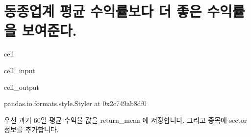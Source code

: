 \documentclass[letterpaper,10pt,english]{jupyterBook}
\begin{document}
\section{동종업계 평균 수익률보다 더 좋은 수익률을 보여준다.}
\label{\detokenize{chapter5/5.1.6_Hypothesis_6:id1}}\label{\detokenize{chapter5/5.1.6_Hypothesis_6::doc}}
\begin{sphinxuseclass}{cell}\begin{sphinxVerbatimInput}

\begin{sphinxuseclass}{cell_input}
\begin{sphinxVerbatim}[commandchars=\\\{\}]
  
\end{sphinxVerbatim}

\end{sphinxuseclass}\end{sphinxVerbatimInput}
\begin{sphinxVerbatimOutput}

\begin{sphinxuseclass}{cell_output}
\begin{sphinxVerbatim}[commandchars=\\\{\}]
\PYGZlt{}pandas.io.formats.style.Styler at 0x2c749ab8df0\PYGZgt{}
\end{sphinxVerbatim}

\end{sphinxuseclass}\end{sphinxVerbatimOutput}

\end{sphinxuseclass}
\sphinxAtStartPar
 우선 과거 60일 평균 수익율 값을 return\_mean 에 저장합니다. 그리고 종목에 sector 정보를 추가합니다.
\end{document}
